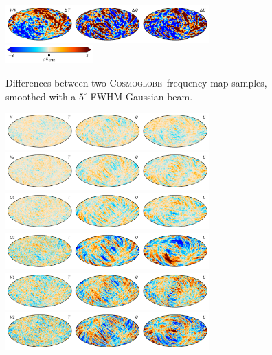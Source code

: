 \documentclass[twocolumn]{../../common/aa}
\newcommand{\cosmoglobe}{\textsc{Cosmoglobe}}
\begin{document}
\begin{figure}
	\includegraphics[width=0.7\textwidth]{figures/090-WMAP_W4_sampdiff.pdf}\\
	\includegraphics[width=0.30\textwidth]{figures/cbar_3uK.pdf}
	\caption{Differences between two \cosmoglobe\ frequency map samples, smoothed with a $5^\circ$ FWHM Gaussian beam.}
        \label{fig:sampdiff}
\end{figure}
\begin{figure}
	\centering
	\includegraphics[width=0.7\textwidth]{figures/tod_ncorr_K_IQU.pdf}\\
	\includegraphics[width=0.7\textwidth]{figures/tod_ncorr_Ka_IQU.pdf}\\
	\includegraphics[width=0.7\textwidth]{figures/tod_ncorr_Q1_IQU.pdf}\\
	\includegraphics[width=0.7\textwidth]{figures/tod_ncorr_Q2_IQU.pdf}\\
	\includegraphics[width=0.7\textwidth]{figures/tod_ncorr_V1_IQU.pdf}\\
	\includegraphics[width=0.7\textwidth]{figures/tod_ncorr_V2_IQU.pdf}\\

\end{figure}
\end{document}
